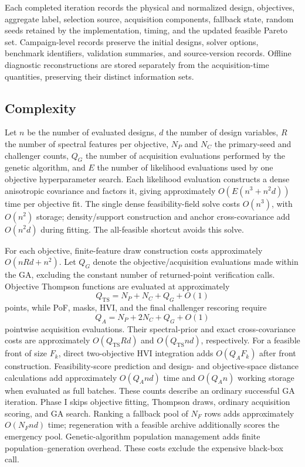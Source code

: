\documentclass[twoside]{article}
\begin{document}
Each completed iteration records the physical and normalized design,
objectives, aggregate label, selection source, acquisition components,
fallback state, random seeds retained by the implementation, timing, and the
updated feasible Pareto set. Campaign-level records preserve the initial
designs, solver options, benchmark identifiers, validation summaries, and
source-version records. Offline diagnostic reconstructions are stored separately
from the acquisition-time quantities, preserving their distinct information
sets.

\subsection{Complexity}

Let \(n\) be the number of evaluated designs, \(d\) the number of design
variables, \(R\) the number of spectral features per objective,
\(N_P\) and \(N_C\) the primary-seed and challenger counts, \(Q_G\) the
number of acquisition evaluations performed by the genetic algorithm, and
\(E\) the number of likelihood evaluations used by one objective
hyperparameter search.  Each
likelihood evaluation constructs a dense anisotropic covariance and factors
it, giving approximately \(O(E(n^3+n^2d))\) time per objective fit.  The
single dense feasibility-field solve costs \(O(n^3)\), with \(O(n^2)\)
storage; density/support construction and anchor cross-covariance add
\(O(n^2d)\) during fitting. The all-feasible shortcut avoids this solve.

For each objective, finite-feature draw construction costs approximately
\(O(nRd+n^2)\). Let \(Q_G\) denote the objective/acquisition evaluations made
within the GA, excluding the constant number of returned-point verification
calls. Objective Thompson functions are evaluated at approximately
\[
  Q_{\mathrm{TS}}=N_P+N_C+Q_G+O(1)
\]
points, while PoF, masks, HVI, and the final challenger rescoring require
\[
  Q_A=N_P+2N_C+Q_G+O(1)
\]
pointwise acquisition evaluations. Their spectral-prior and exact
cross-covariance costs are approximately
\(O(Q_{\mathrm{TS}}Rd)\) and \(O(Q_{\mathrm{TS}}nd)\), respectively.
For a feasible front of size \(F_k\), direct two-objective HVI integration
adds \(O(Q_A F_k)\) after front construction. Feasibility-score prediction
and design- and objective-space distance calculations add approximately
\(O(Q_A n d)\) time and \(O(Q_A n)\) working storage when evaluated as full
batches. These counts describe an ordinary successful GA iteration. Phase I
skips objective fitting, Thompson draws, ordinary acquisition scoring, and GA
search. Ranking a fallback pool of \(N_F\) rows adds approximately
\(O(N_Fnd)\) time; regeneration with a feasible archive additionally scores
the emergency pool. Genetic-algorithm population management adds finite
population--generation overhead. These costs exclude the expensive black-box
call.
\end{document}
